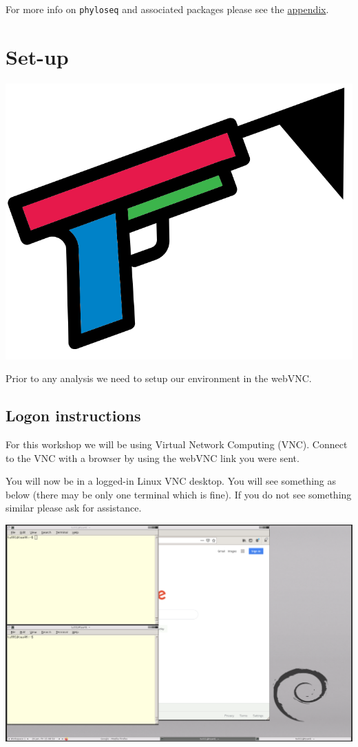 \documentclass[
]{book}
\begin{document}
For more info on \texttt{phyloseq} and associated packages please see the \protect\hyperlink{phyloseq_appendix}{appendix}.

\hypertarget{setupchap}{%
\chapter{Set-up}\label{setupchap}}

\includegraphics{figures/start.png}

Prior to any analysis we need to setup our environment in the webVNC.

\hypertarget{cluster}{%
\section{Logon instructions}\label{cluster}}

For this workshop we will be using Virtual Network Computing (VNC). Connect to the VNC with a browser by using the webVNC link you were sent.

You will now be in a logged-in Linux VNC desktop.
You will see something as below (there may be only one terminal which is fine).
If you do not see something similar please ask for assistance.

\includegraphics{figures/logon_pic.png}
\end{document}
